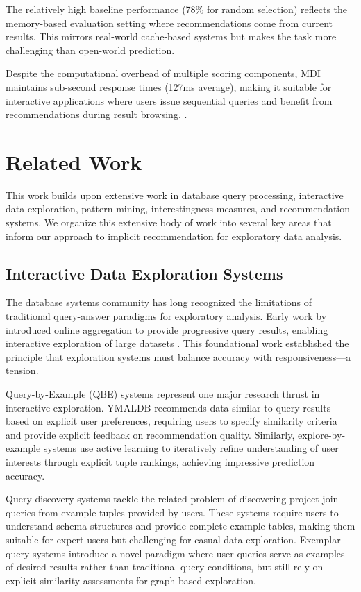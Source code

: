 \documentclass[sigconf, nonacm]{acmart}
\begin{document}
The relatively high baseline performance (78\% for random selection) reflects the memory-based evaluation setting where recommendations come from current results. This mirrors real-world cache-based systems but makes the task more challenging than open-world prediction. 

Despite the computational overhead of multiple scoring components, MDI maintains sub-second response times (127ms average), making it suitable for interactive applications where users issue sequential queries and benefit from recommendations during result browsing. .


\section{Related Work}

This work builds upon extensive work in database query processing, interactive data exploration, pattern mining, interestingness measures, and recommendation systems. We organize this extensive body of work into several key areas that inform our approach to implicit recommendation for exploratory data analysis.

\subsection{Interactive Data Exploration Systems}

The database systems community has long recognized the limitations of traditional query-answer paradigms for exploratory analysis. Early work by introduced online aggregation to provide progressive query results, enabling interactive exploration of large datasets \cite{hellerstein1999online}. This foundational work established the principle that exploration systems must balance accuracy with responsiveness—a tension.

Query-by-Example (QBE) systems represent one major research thrust in interactive exploration. YMALDB \cite{drosouYmaldbExploringRelational2013} recommends data similar to query results based on explicit user preferences, requiring users to specify similarity criteria and provide explicit feedback on recommendation quality. Similarly, explore-by-example systems \cite{dimitriadouAIDEActiveLearningBased2016} use active learning to iteratively refine understanding of user interests through explicit tuple rankings, achieving impressive prediction accuracy. 

Query discovery systems \cite{shen2014discovering} tackle the related problem of discovering project-join queries from example tuples provided by users. These systems require users to understand schema structures and provide complete example tables, making them suitable for expert users but challenging for casual data exploration. Exemplar query systems \cite{mottin2014exemplar} introduce a novel paradigm where user queries serve as examples of desired results rather than traditional query conditions, but still rely on explicit similarity assessments for graph-based exploration.
\end{document}
